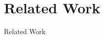 \section{Related Work}

\begin{frame}
      \begin{center}
     	\huge Related Work
     \end{center}
\end{frame}

